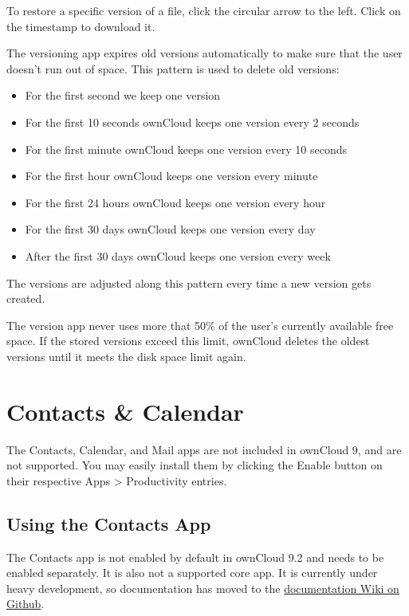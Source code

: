 \documentclass[letterpaper,10pt,english]{sphinxmanual}
\begin{document}
To restore a specific version of a file, click the circular arrow to the left.
Click on the timestamp to download it.

The versioning app expires old versions automatically to make sure that
the user doesn't run out of space. This pattern is used to delete
old versions:
\begin{itemize}
\item {} 
For the first second we keep one version

\item {} 
For the first 10 seconds ownCloud keeps one version every 2 seconds

\item {} 
For the first minute ownCloud keeps one version every 10 seconds

\item {} 
For the first hour ownCloud keeps one version every minute

\item {} 
For the first 24 hours ownCloud keeps one version every hour

\item {} 
For the first 30 days ownCloud keeps one version every day

\item {} 
After the first 30 days ownCloud keeps one version every week

\end{itemize}

The versions are adjusted along this pattern every time a new version gets
created.

The version app never uses more that 50\% of the user's currently available free
space. If the stored versions exceed this limit, ownCloud deletes the oldest
versions until it meets the disk space limit again.


\chapter{Contacts \& Calendar}
\label{pim/index:contacts-calendar}\label{pim/index::doc}
The Contacts, Calendar, and Mail apps are not included in ownCloud 9, and are
not supported. You may easily install them by clicking the Enable button on
their respective Apps \textgreater{} Productivity entries.


\section{Using the Contacts App}
\label{pim/contacts:using-the-contacts-app}\label{pim/contacts::doc}
The Contacts app is not enabled by default in ownCloud 9.2 and needs to
be enabled separately. It is also not a supported core app. It is currently
under heavy development, so documentation has moved to the \href{https://github.com/owncloud/documentation/wiki/Using-the-Contacts-App-in-ownCloud-9.0}{documentation Wiki
on Github}.
\end{document}
